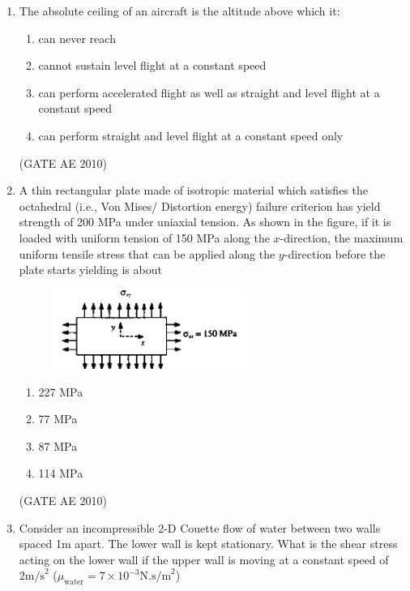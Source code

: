 \documentclass[journal]{IEEEtran}
\begin{document}
\begin{enumerate}
\item The absolute ceiling of an aircraft is the altitude above which it:
\begin{enumerate}
\item can never reach
\item cannot sustain level flight at a constant speed
\item can perform accelerated flight as well as straight and level flight at a constant speed
\item can perform straight and level flight at a constant speed only
\end{enumerate}
\hfill (GATE AE 2010)

\item A thin rectangular plate made of isotropic material which satisfies the octahedral (i.e., Von Mises/ Distortion energy) failure criterion has yield strength of 200 MPa under uniaxial tension. As shown in the figure, if it is loaded with uniform tension of 150 MPa along the $ x $-direction, the maximum uniform tensile stress that can be applied along the $ y $-direction before the plate starts yielding is about 
    
\begin{figure}[H]
    \centering
    \includegraphics[width=0.6\textwidth]{1.png}
    \caption{}
    \label{fig:question13}
\end{figure}
    
\begin{multicols}{4}
\begin{enumerate}
\item 227 MPa
\item 77 MPa
\item 87 MPa
\item 114 MPa
\end{enumerate}
\end{multicols}
\hfill (GATE AE 2010)

\item Consider an incompressible 2-D Couette flow of water between two walls spaced 1m apart. The lower wall is kept stationary. What is the shear stress acting on the lower wall if the upper wall is moving at a constant speed of $ 2  \text{m/s}^2 $ ($ \mu_{\text{water}} = 7 \times 10^{-3}  \text{N.s/m}^2 $)
    

\end{enumerate}
\end{document}
